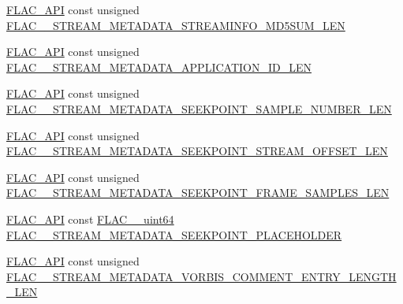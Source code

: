 \begin{DoxyCompactItemize}
\item 
\mbox{\hyperlink{group__flac__export_ga56ca07df8a23310707732b1c0007d6f5}{F\+L\+A\+C\+\_\+\+A\+PI}} const unsigned \mbox{\hyperlink{group__flac__format_ga35030375a8c77a3799bceea07f95b221}{F\+L\+A\+C\+\_\+\+\_\+\+S\+T\+R\+E\+A\+M\+\_\+\+M\+E\+T\+A\+D\+A\+T\+A\+\_\+\+S\+T\+R\+E\+A\+M\+I\+N\+F\+O\+\_\+\+M\+D5\+S\+U\+M\+\_\+\+L\+EN}}
\item 
\mbox{\hyperlink{group__flac__export_ga56ca07df8a23310707732b1c0007d6f5}{F\+L\+A\+C\+\_\+\+A\+PI}} const unsigned \mbox{\hyperlink{group__flac__format_ga8a1d1839a9e22692dfeaf9fce9cb9991}{F\+L\+A\+C\+\_\+\+\_\+\+S\+T\+R\+E\+A\+M\+\_\+\+M\+E\+T\+A\+D\+A\+T\+A\+\_\+\+A\+P\+P\+L\+I\+C\+A\+T\+I\+O\+N\+\_\+\+I\+D\+\_\+\+L\+EN}}
\item 
\mbox{\hyperlink{group__flac__export_ga56ca07df8a23310707732b1c0007d6f5}{F\+L\+A\+C\+\_\+\+A\+PI}} const unsigned \mbox{\hyperlink{group__flac__format_ga8fe65704a9be1ad13a1654e78ab80c32}{F\+L\+A\+C\+\_\+\+\_\+\+S\+T\+R\+E\+A\+M\+\_\+\+M\+E\+T\+A\+D\+A\+T\+A\+\_\+\+S\+E\+E\+K\+P\+O\+I\+N\+T\+\_\+\+S\+A\+M\+P\+L\+E\+\_\+\+N\+U\+M\+B\+E\+R\+\_\+\+L\+EN}}
\item 
\mbox{\hyperlink{group__flac__export_ga56ca07df8a23310707732b1c0007d6f5}{F\+L\+A\+C\+\_\+\+A\+PI}} const unsigned \mbox{\hyperlink{group__flac__format_gac351fcf185d0a36ddf6f0d358258ed5c}{F\+L\+A\+C\+\_\+\+\_\+\+S\+T\+R\+E\+A\+M\+\_\+\+M\+E\+T\+A\+D\+A\+T\+A\+\_\+\+S\+E\+E\+K\+P\+O\+I\+N\+T\+\_\+\+S\+T\+R\+E\+A\+M\+\_\+\+O\+F\+F\+S\+E\+T\+\_\+\+L\+EN}}
\item 
\mbox{\hyperlink{group__flac__export_ga56ca07df8a23310707732b1c0007d6f5}{F\+L\+A\+C\+\_\+\+A\+PI}} const unsigned \mbox{\hyperlink{group__flac__format_gadf07cc8895679fc151c2cc4609d8c394}{F\+L\+A\+C\+\_\+\+\_\+\+S\+T\+R\+E\+A\+M\+\_\+\+M\+E\+T\+A\+D\+A\+T\+A\+\_\+\+S\+E\+E\+K\+P\+O\+I\+N\+T\+\_\+\+F\+R\+A\+M\+E\+\_\+\+S\+A\+M\+P\+L\+E\+S\+\_\+\+L\+EN}}
\item 
\mbox{\hyperlink{group__flac__export_ga56ca07df8a23310707732b1c0007d6f5}{F\+L\+A\+C\+\_\+\+A\+PI}} const \mbox{\hyperlink{ordinals_8h_aa78c8c70a3eb8a58af7436f278acde8e}{F\+L\+A\+C\+\_\+\+\_\+uint64}} \mbox{\hyperlink{group__flac__format_ga39373aa806e3132146c1f29f35a23877}{F\+L\+A\+C\+\_\+\+\_\+\+S\+T\+R\+E\+A\+M\+\_\+\+M\+E\+T\+A\+D\+A\+T\+A\+\_\+\+S\+E\+E\+K\+P\+O\+I\+N\+T\+\_\+\+P\+L\+A\+C\+E\+H\+O\+L\+D\+ER}}
\item 
\mbox{\hyperlink{group__flac__export_ga56ca07df8a23310707732b1c0007d6f5}{F\+L\+A\+C\+\_\+\+A\+PI}} const unsigned \mbox{\hyperlink{group__flac__format_ga0153a5ed9577e276250dc8414e236172}{F\+L\+A\+C\+\_\+\+\_\+\+S\+T\+R\+E\+A\+M\+\_\+\+M\+E\+T\+A\+D\+A\+T\+A\+\_\+\+V\+O\+R\+B\+I\+S\+\_\+\+C\+O\+M\+M\+E\+N\+T\+\_\+\+E\+N\+T\+R\+Y\+\_\+\+L\+E\+N\+G\+T\+H\+\_\+\+L\+EN}}

\end{DoxyCompactItemize}

